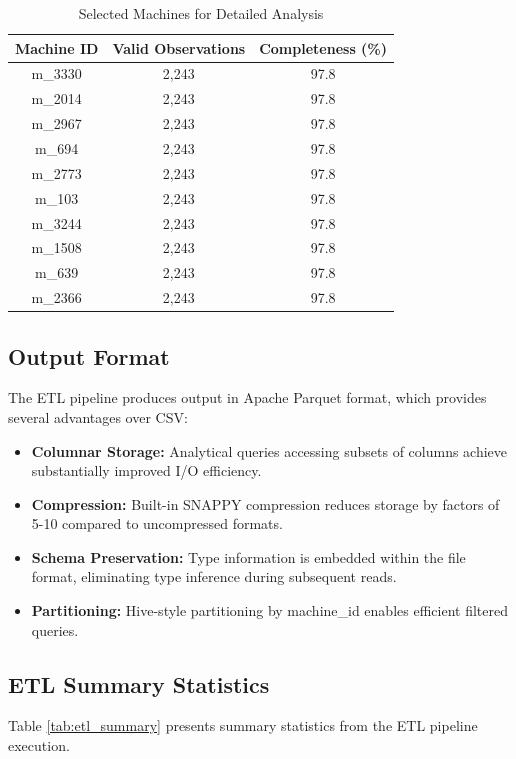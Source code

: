 \documentclass[12pt]{report}
\begin{document}
\begin{table}[H]
\centering
\caption{Selected Machines for Detailed Analysis}
\label{tab:selected_machines}
\begin{tabular}{ccc}
\toprule
\textbf{Machine ID} & \textbf{Valid Observations} & \textbf{Completeness (\%)} \\
\midrule
m\_3330 & 2,243 & 97.8 \\
m\_2014 & 2,243 & 97.8 \\
m\_2967 & 2,243 & 97.8 \\
m\_694 & 2,243 & 97.8 \\
m\_2773 & 2,243 & 97.8 \\
m\_103 & 2,243 & 97.8 \\
m\_3244 & 2,243 & 97.8 \\
m\_1508 & 2,243 & 97.8 \\
m\_639 & 2,243 & 97.8 \\
m\_2366 & 2,243 & 97.8 \\
\bottomrule
\end{tabular}
\end{table}

\subsection{Output Format}

The ETL pipeline produces output in Apache Parquet format, which provides several advantages over CSV:

\begin{itemize}
    \item \textbf{Columnar Storage:} Analytical queries accessing subsets of columns achieve substantially improved I/O efficiency.
    \item \textbf{Compression:} Built-in SNAPPY compression reduces storage by factors of 5-10 compared to uncompressed formats.
    \item \textbf{Schema Preservation:} Type information is embedded within the file format, eliminating type inference during subsequent reads.
    \item \textbf{Partitioning:} Hive-style partitioning by machine\_id enables efficient filtered queries.
\end{itemize}

\subsection{ETL Summary Statistics}

Table \ref{tab:etl_summary} presents summary statistics from the ETL pipeline execution.
\end{document}
